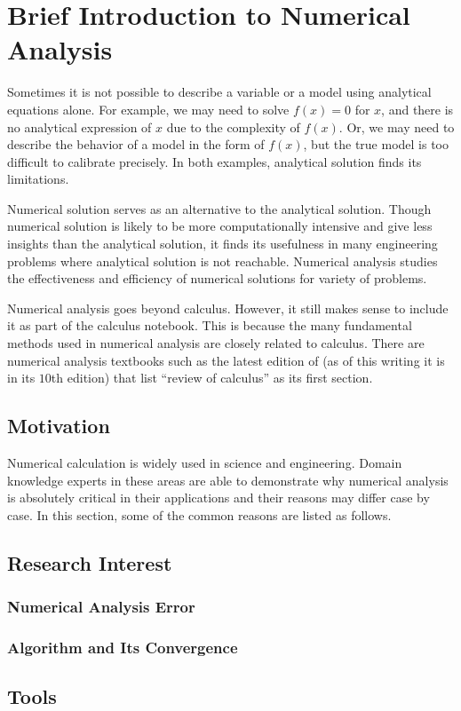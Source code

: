 \chapter{Brief Introduction to Numerical Analysis}

Sometimes it is not possible to describe a variable or a model using analytical equations alone. For example, we may need to solve $f(x)=0$ for $x$, and there is no analytical expression of $x$ due to the complexity of $f(x)$. Or, we may need to describe the behavior of a model in the form of $f(x)$, but the true model is too difficult to calibrate precisely. In both examples, analytical solution finds its limitations.

Numerical solution serves as an alternative to the analytical solution. Though numerical solution is likely to be more computationally intensive and give less insights than the analytical solution, it finds its usefulness in many engineering problems where analytical solution is not reachable. Numerical analysis studies the effectiveness and efficiency of numerical solutions for variety of problems.

Numerical analysis goes beyond calculus. However, it still makes sense to include it as part of the calculus notebook. This is because the many fundamental methods used in numerical analysis are closely related to calculus. There are numerical analysis textbooks such as the latest edition of \cite{burden1997numerical} (as of this writing it is in its $10$th edition) that list ``review of calculus'' as its first section.

\section{Motivation}

Numerical calculation is widely used in science and engineering. Domain knowledge experts in these areas are able to demonstrate why numerical analysis is absolutely critical in their applications and their reasons may differ case by case. In this section, some of the common reasons are listed as follows.



\section{Research Interest}

\subsection{Numerical Analysis Error}

\subsection{Algorithm and Its Convergence}

\section{Tools}

